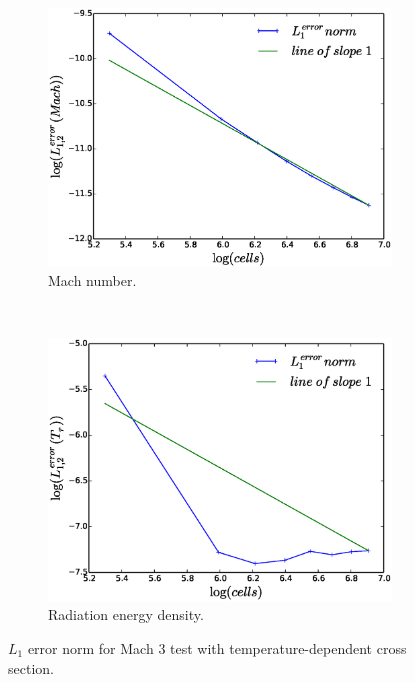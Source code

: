 \documentclass[times,doublespace]{fldauth}%
\begin{document}
\begin{figure}[ht]
    \begin{subfigure}{0.5\textwidth}
    \centering
    \includegraphics[width=\linewidth]{figures/dpt-xs/mach-3-mach-number-convergence.eps}
    \caption{Mach number.}\label{fig:mach-3-dpt-xs-mach-conv}
    \end{subfigure}
    ~
    \begin{subfigure}{0.5\textwidth}
    \centering
    \includegraphics[width=\linewidth]{figures/dpt-xs/mach-3-radiation-convergence.eps}
    \caption{Radiation energy density.}\label{fig:mach-3-dpt-xs-radiation-conv}
    \end{subfigure}        
\caption{$L_1$ error norm for Mach $3$ test with temperature-dependent cross section.}\label{fig:mach-3-dpt-xs-conv} 
\end{figure}
\end{document}

